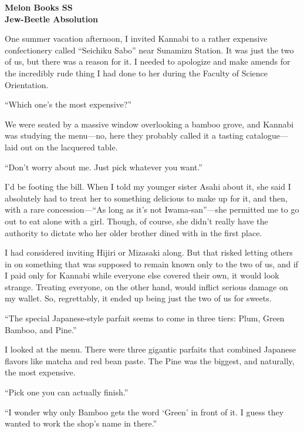 \documentclass[
    a4paper,
    12pt,
    twoside,
    openany,
    UTF8,
    fontset=windows
]{ctexbook}
\begin{document}
\clearpage
\thispagestyle{plain}
\begin{center}
    \large\bfseries
    Melon Books SS\\
    Jew-Beetle Absolution
\end{center}
\label{sec:melon}
\vspace{1cm}


One summer vacation afternoon, I invited Kannabi to a rather expensive confectionery called ``Seichiku Sabo'' near Sunamizu Station. It was just the two of us, but there was a reason for it. I needed to apologize and make amends for the incredibly rude thing I had done to her during the Faculty of Science Orientation.

``Which one's the most expensive?''

We were seated by a massive window overlooking a bamboo grove, and Kannabi was studying the menu---no, here they probably called it a tasting catalogue---laid out on the lacquered table.

``Don't worry about me. Just pick whatever you want.''

I'd be footing the bill. When I told my younger sister Asahi about it, she said I absolutely had to treat her to something delicious to make up for it, and then, with a rare concession---``As long as it's not Iwama-san''---she permitted me to go out to eat alone with a girl. Though, of course, she didn't really have the authority to dictate who her older brother dined with in the first place.

I had considered inviting Hijiri or Mizasaki along. But that risked letting others in on something that was supposed to remain known only to the two of us, and if I paid only for Kannabi while everyone else covered their own, it would look strange. Treating everyone, on the other hand, would inflict serious damage on my wallet. So, regrettably, it ended up being just the two of us for sweets.

``The special Japanese-style parfait seems to come in three tiers: Plum, Green Bamboo, and Pine.''

I looked at the menu. There were three gigantic parfaits that combined Japanese flavors like matcha and red bean paste. The Pine was the biggest, and naturally, the most expensive.

``Pick one you can actually finish.''

``I wonder why only Bamboo gets the word `Green' in front of it. I guess they wanted to work the shop's name in there.''
\end{document}
